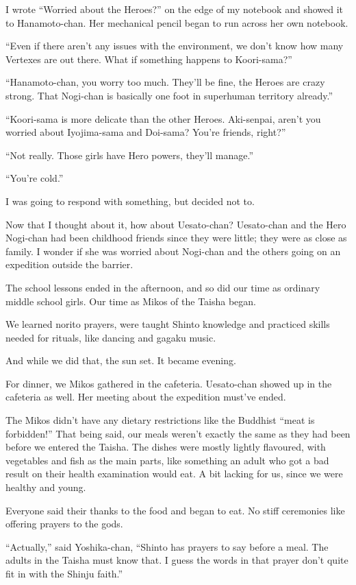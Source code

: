 I wrote ``Worried about the Heroes?'' on the edge of my notebook and showed it to Hanamoto-chan. Her mechanical pencil began to run across her own notebook.

``Even if there aren't any issues with the environment, we don't know how many Vertexes are out there. What if something happens to Koori-sama?''

``Hanamoto-chan, you worry too much. They'll be fine, the Heroes are crazy strong. That Nogi-chan is basically one foot in superhuman territory already.''

``Koori-sama is more delicate than the other Heroes. Aki-senpai, aren't you worried about Iyojima-sama and Doi-sama? You're friends, right?''

``Not really. Those girls have Hero powers, they'll manage.''

``You're cold.''

I was going to respond with something, but decided not to.

Now that I thought about it, how about Uesato-chan? Uesato-chan and the Hero Nogi-chan had been childhood friends since they were little; they were as close as family. I wonder if she was worried about Nogi-chan and the others going on an expedition outside the barrier.

The school lessons ended in the afternoon, and so did our time as ordinary middle school girls. Our time as Mikos of the Taisha began.

We learned norito prayers, were taught Shinto knowledge and practiced skills needed for rituals, like dancing and gagaku music.

And while we did that, the sun set. It became evening.

For dinner, we Mikos gathered in the cafeteria. Uesato-chan showed up in the cafeteria as well. Her meeting about the expedition must've ended.

The Mikos didn't have any dietary restrictions like the Buddhist ``meat is forbidden!'' That being said, our meals weren't exactly the same as they had been before we entered the Taisha. The dishes were mostly lightly flavoured, with vegetables and fish as the main parts, like something an adult who got a bad result on their health examination would eat. A bit lacking for us, since we were healthy and young.

Everyone said their thanks to the food and began to eat. No stiff ceremonies like offering prayers to the gods.

``Actually,'' said Yoshika-chan, ``Shinto has prayers to say before a meal. The adults in the Taisha must know that. I guess the words in that prayer don't quite fit in with the Shinju faith.''

